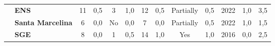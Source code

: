 \begin{table}[!htb]
\begin{tabular}{c|p{2cm}|cc|cc|cc|cc|cc|c}
    {\cellcolor[rgb]{0.753,0.753,0.753}}                                            & {\cellcolor[rgb]{0.753,0.753,0.753}}\textbf{ENS}                                                   & 11                                                                        & 0,5                                                                       & 3                                                                         & 1,0                                                                      & 12                                                       & 0,5                                               & Partially                                          & 0,5                                               & 2022                                               & 1,0                                                                                                                                                 & 3,5 \\
    \rowcolor[rgb]{0.898,0.898,0.898} {\cellcolor[rgb]{0.753,0.753,0.753}}          & {\cellcolor[rgb]{0.753,0.753,0.753}}\textbf{Santa Marcelina}                                       & 6                                                                         & 0,0                                                                       & No                                                                        & 0,0                                                                      & 7                                                        & 0,0                                               & Partially                                          & 0,5                                               & 2022                                               & 1,0                                                                                                                                                 & 1,5 \\
    {\cellcolor[rgb]{0.753,0.753,0.753}}                                            & {\cellcolor[rgb]{0.753,0.753,0.753}}\textbf{SGE}                                                   & 8                                                                         & 0,0                                                                       & 1                                                                         & 0,5                                                                      & 14                                                       & 1,0                                               & Yes                                                & 1,0                                               & 2016                                               & 0,0                                                                                                                                                 & 2,5 \\

\end{tabular}
\end{table}
